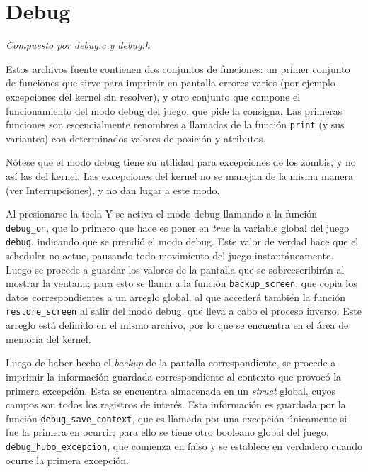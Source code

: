 \documentclass{article}
\begin{document}
	\section{Debug}
	\vspace{-1cm}
	\begin{flushright}
		\textit{Compuesto por debug.c y debug.h}
	\end{flushright}
	Estos archivos fuente contienen dos conjuntos de funciones: un primer conjunto de funciones que sirve para imprimir en pantalla errores varios (por ejemplo excepciones del kernel sin resolver), y otro conjunto que compone el funcionamiento del modo debug del juego, que pide la consigna. Las primeras funciones son escencialmente renombres a llamadas de la función \texttt{print} (y sus variantes) con determinados valores de posición y atributos.

	Nótese que el modo debug tiene su utilidad para excepciones de los zombis, y no así las del kernel. Las excepciones del kernel no se manejan de la misma manera (ver Interrupciones), y no dan lugar a este modo.

	Al presionarse la tecla Y se activa el modo debug llamando a la función \texttt{debug\_on}, que lo primero que hace es poner en \textit{true} la variable global del juego \texttt{debug}, indicando que se prendió el modo debug. Este valor de verdad hace que el scheduler no actue, pausando todo movimiento del juego instantáneamente. Luego se procede a guardar los valores de la pantalla que se sobreescribirán al mostrar la ventana; para esto se llama a la función \texttt{backup\_screen}, que copia los datos correspondientes a un arreglo global, al que accederá también la función \texttt{restore\_screen} al salir del modo debug, que lleva a cabo el proceso inverso. Este arreglo está definido en el mismo archivo, por lo que se encuentra en el área de memoria del kernel.

	Luego de haber hecho el \textit{backup} de la pantalla correspondiente, se procede a imprimir la información guardada correspondiente al contexto que provocó la primera excepción. Esta se encuentra almacenada en un \textit{struct} global, cuyos campos son todos los registros de interés. Esta información es guardada por la función \texttt{debug\_save\_context}, que  es llamada por una excepción únicamente si fue la primera en ocurrir; para ello se tiene otro booleano global del juego, \texttt{debug\_hubo\_excepcion}, que comienza en falso y se establece en verdadero cuando ocurre la primera excepción.
\end{document}
